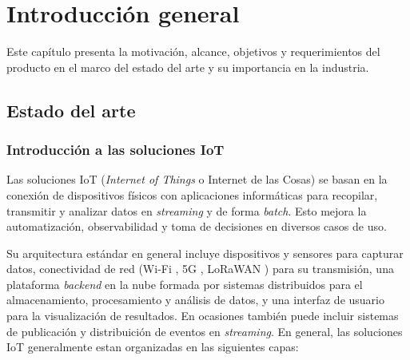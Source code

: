 
\chapter{Introducción general} %

\label{Chapter1} %
\label{IntroGeneral}

Este capítulo presenta la motivación, alcance, objetivos y requerimientos del producto en el marco del estado del arte y su importancia en la industria.


\newcommand{\keyword}[1]{\textbf{#1}}
\newcommand{\tabhead}[1]{\textbf{#1}}
\newcommand{\code}[1]{\texttt{#1}}
\newcommand{\file}[1]{\texttt{\bfseries#1}}
\newcommand{\option}[1]{\texttt{\itshape#1}}
\newcommand{\grados}{$^{\circ}$}



\section{Estado del arte}

\subsection{Introducción a las soluciones IoT}


Las soluciones IoT (\textit{Internet of Things} o Internet de las Cosas) se basan en la conexión de dispositivos físicos con aplicaciones informáticas para recopilar, transmitir y analizar datos en \textit{streaming} y de forma \textit{batch}. Esto mejora la automatización, observabilidad y toma de decisiones en diversos casos de uso. 

Su arquitectura estándar en general incluye dispositivos y sensores para capturar datos, conectividad de red (Wi-Fi \cite{wifi}, 5G \cite{5g}, LoRaWAN \cite{lorawan}) para su transmisión, una plataforma \textit{backend} en la nube formada por sistemas distribuidos para el almacenamiento, procesamiento y análisis de datos, y una interfaz de usuario para la visualización de resultados. En ocasiones también puede incluir sistemas de publicación y distribuición de eventos en \textit{streaming}. En general, las soluciones IoT generalmente estan organizadas en las siguientes capas:

